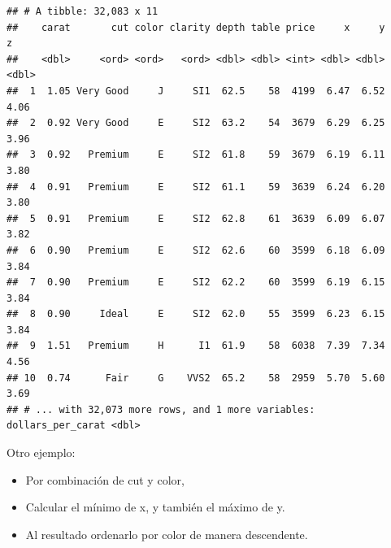 \documentclass[]{book}
\newenvironment{Shaded}{\begin{snugshade}}{\end{snugshade}}
\newcommand{\KeywordTok}[1]{\textcolor[rgb]{0.13,0.29,0.53}{\textbf{#1}}}
\newcommand{\DataTypeTok}[1]{\textcolor[rgb]{0.13,0.29,0.53}{#1}}
\newcommand{\DecValTok}[1]{\textcolor[rgb]{0.00,0.00,0.81}{#1}}
\newcommand{\StringTok}[1]{\textcolor[rgb]{0.31,0.60,0.02}{#1}}
\newcommand{\CommentTok}[1]{\textcolor[rgb]{0.56,0.35,0.01}{\textit{#1}}}
\newcommand{\OperatorTok}[1]{\textcolor[rgb]{0.81,0.36,0.00}{\textbf{#1}}}
\newcommand{\NormalTok}[1]{#1}
\providecommand{\tightlist}{%
  \setlength{\itemsep}{0pt}\setlength{\parskip}{0pt}}
\theoremstyle{definition}
\theoremstyle{definition}
\theoremstyle{definition}
\theoremstyle{remark}
\begin{document}
\begin{verbatim}
## # A tibble: 32,083 x 11
##    carat       cut color clarity depth table price     x     y     z
##    <dbl>     <ord> <ord>   <ord> <dbl> <dbl> <int> <dbl> <dbl> <dbl>
##  1  1.05 Very Good     J     SI1  62.5    58  4199  6.47  6.52  4.06
##  2  0.92 Very Good     E     SI2  63.2    54  3679  6.29  6.25  3.96
##  3  0.92   Premium     E     SI2  61.8    59  3679  6.19  6.11  3.80
##  4  0.91   Premium     E     SI2  61.1    59  3639  6.24  6.20  3.80
##  5  0.91   Premium     E     SI2  62.8    61  3639  6.09  6.07  3.82
##  6  0.90   Premium     E     SI2  62.6    60  3599  6.18  6.09  3.84
##  7  0.90   Premium     E     SI2  62.2    60  3599  6.19  6.15  3.84
##  8  0.90     Ideal     E     SI2  62.0    55  3599  6.23  6.15  3.84
##  9  1.51   Premium     H      I1  61.9    58  6038  7.39  7.34  4.56
## 10  0.74      Fair     G    VVS2  65.2    58  2959  5.70  5.60  3.69
## # ... with 32,073 more rows, and 1 more variables: dollars_per_carat <dbl>
\end{verbatim}

Otro ejemplo:

\begin{itemize}
\tightlist
\item
  Por combinación de cut y color,
\item
  Calcular el mínimo de x, y también el máximo de y.
\item
  Al resultado ordenarlo por color de manera descendente.
\end{itemize}

\begin{Shaded}
\end{Shaded}
\end{document}
